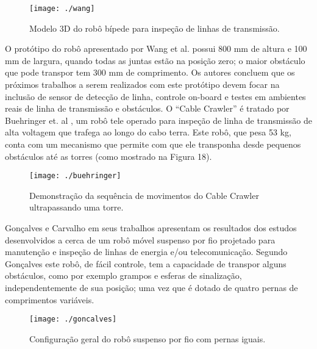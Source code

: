 \begin{figure} [h!]	
	\caption{Modelo 3D do robô bípede para inspeção de linhas de transmissão.}
	\label{img:wang}											 
	\centering													 
	\texttt{[image: ./wang]}
\end{figure}													 

O protótipo do robô apresentado por Wang et al. \cite{wang2010design} possui 800 mm de altura e 100 mm de largura, quando todas as juntas estão na posição zero; o maior obstáculo que pode transpor tem 300 mm de comprimento. Os autores concluem que os próximos trabalhos a serem realizados com este protótipo devem focar na inclusão de sensor de detecção de linha, controle on-board e testes em ambientes reais de linha de transmissão e obstáculos.  
O “Cable Crawler” é tratado por Buehringer et. al \cite{buhringer2010cable}, um robô tele operado para inspeção de linha de transmissão de alta voltagem que trafega ao longo do cabo terra. Este robô, que pesa 53 kg, conta com um mecanismo que permite com que ele transponha desde pequenos obstáculos até as torres (como mostrado na Figura 18). 

\begin{figure} [h!]	
	\caption{Demonstração da sequência de movimentos do Cable Crawler ultrapassando uma torre.}
	\label{img:buehringer}											 
	\centering													 
	\texttt{[image: ./buehringer]}
\end{figure}													 

Gonçalves e Carvalho em seus trabalhos \cite{goncalves2010graphical} \cite{gonccalves2013review}  apresentam os resultados dos estudos desenvolvidos a cerca de um robô móvel suspenso por fio projetado para manutenção e inspeção de linhas de energia e/ou telecomunicação. Segundo Gonçalves \cite{gonccalves2006kinematics} este robô, de fácil controle, tem a capacidade de transpor alguns obstáculos, como por exemplo grampos e esferas de sinalização, independentemente de sua posição; uma vez que é dotado de quatro pernas de comprimentos variáveis.

\begin{figure} [h!]	
	\caption{Configuração geral do robô suspenso por fio com pernas iguais.}
	\label{img:goncalves}											 
	\centering													 
	\texttt{[image: ./goncalves]}
\end{figure}													 

